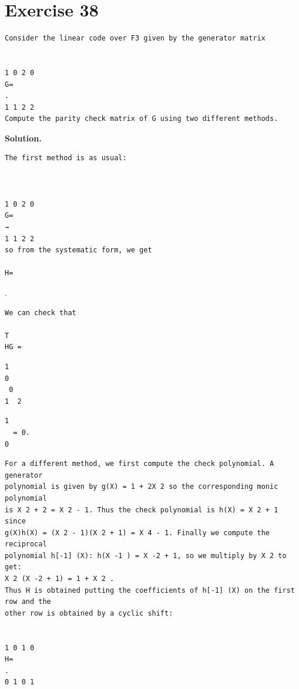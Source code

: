 \documentclass[11pt]{article}
\begin{document}
\section*{Exercise 38}
\begin{exercisebox}
\begin{Verbatim}[fontsize=\small]
Consider the linear code over F3 given by the generator matrix


1 0 2 0
G=
.
1 1 2 2
Compute the parity check matrix of G using two different methods.
\end{Verbatim}
\end{exercisebox}
\begin{solutionbox}
\textbf{Solution.}

\begin{Verbatim}[fontsize=\small]
The first method is as usual:



1 0 2 0
G=
→
1 1 2 2
so from the systematic form, we get

H=
\end{Verbatim}
 .



\begin{Verbatim}[fontsize=\small]
We can check that

T
HG =
\end{Verbatim}
\begin{Verbatim}[fontsize=\small]
 1
0
 0
1  2
\end{Verbatim}
\begin{Verbatim}[fontsize=\small]
1
  = 0.
0
\end{Verbatim}
\begin{Verbatim}[fontsize=\small]
For a different method, we first compute the check polynomial. A generator
polynomial is given by g(X) = 1 + 2X 2 so the corresponding monic polynomial
is X 2 + 2 = X 2 - 1. Thus the check polynomial is h(X) = X 2 + 1 since
g(X)h(X) = (X 2 - 1)(X 2 + 1) = X 4 - 1. Finally we compute the reciprocal
polynomial h[-1] (X): h(X -1 ) = X -2 + 1, so we multiply by X 2 to get:
X 2 (X -2 + 1) = 1 + X 2 .
Thus H is obtained putting the coefficients of h[-1] (X) on the first row and the
other row is obtained by a cyclic shift:


1 0 1 0
H=
.
0 1 0 1
\end{Verbatim}
\end{solutionbox}
\end{document}
